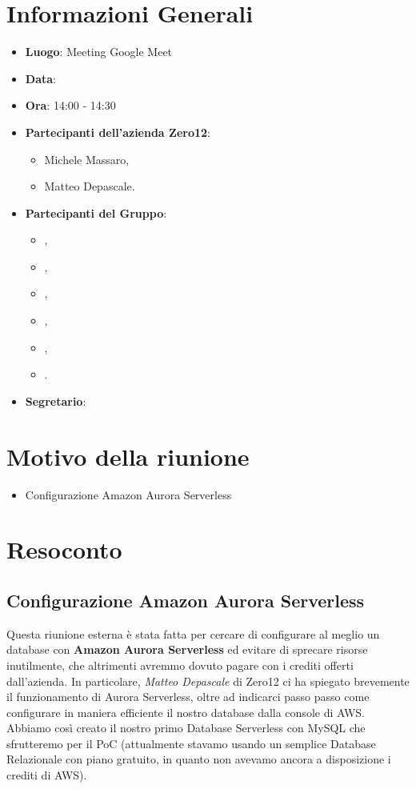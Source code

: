 \section{Informazioni Generali}

\begin{itemize}
\item{\textbf{Luogo}}: Meeting Google Meet
\item{\textbf{Data}}: \D{}
\item{\textbf{Ora}}: 14:00 - 14:30
\item{\textbf{Partecipanti dell'azienda Zero12}}: 
	\begin{itemize}
	\item{Michele Massaro,} 
	\item{Matteo Depascale.}
	\end{itemize} 
\item{\textbf{Partecipanti del Gruppo}}: 
	\begin{itemize}
	\item{\EP{},} 
	\item{\FP{},}
	\item{\GC{},}
	\item{\LW{},}	
	\item{\MB{},}
	\item{\PV{}.}
	\end{itemize} 
\item{\textbf{Segretario}}: \GC{}
\end{itemize}

\section{Motivo della riunione}
\begin{itemize}
\item{Configurazione Amazon Aurora Serverless}
\end{itemize}

\section{Resoconto}

\subsection{Configurazione Amazon Aurora Serverless}

Questa riunione esterna è stata fatta per cercare di configurare al meglio un database con \textbf{Amazon Aurora Serverless} ed evitare di sprecare risorse inutilmente, che altrimenti avremmo dovuto pagare con i crediti offerti dall'azienda. In particolare, \textit{Matteo Depascale} di Zero12 ci ha spiegato brevemente il funzionamento di Aurora Serverless, oltre ad indicarci passo passo come configurare in maniera efficiente il nostro database dalla console di AWS. Abbiamo così creato il nostro primo Database Serverless con MySQL che sfrutteremo per il PoC (attualmente stavamo usando un semplice Database Relazionale con piano gratuito, in quanto non avevamo ancora a disposizione i crediti di AWS). \\

